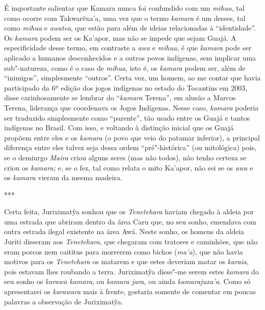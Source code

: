 É importante salientar que Kamara nunca foi confundido com um
\emph{mihua}, tal como ocorre com Takwarẽxa'a, uma vez que o termo
\emph{kamara} é um desses, tal como \emph{mihua} e \emph{awatea}, que
estão para além de ideias relacionadas à ``identidade''. Os \emph{kamara}
podem ser os Ka'apor, mas não se impede que sejam Guajá. A
especificidade desse termo, em contraste a \emph{awa} e \emph{mihua}, é
que \emph{kamara} pode ser aplicado a humanos desconhecidos e a outros
povos indígenas, sem implicar uma sub"-natureza, como é o caso de
\emph{mihua}, isto é, os \emph{kamara} podem ser, além de ``inimigos'',
simplesmente ``outros''. Certa vez, um homem, ao me contar que havia
participado da 6ª edição dos jogos indígenas no estado do Tocantins em
2003, disse carinhosamente se lembrar do ``\emph{kamara} Terena'', em
alusão a Marcos Terena, liderança que coordenava os Jogos Indígenas.
Nesse caso, \emph{kamara} poderia ser traduzido simplesmente como
``parente'', tão usado entre os Guajá e tantos indígenas no Brasil. Com
isso, e voltando à distinção inicial que os Guajá propõem entre eles e
os \emph{kamara} (o povo que veio do patamar inferior), a principal
diferença entre eles talvez seja dessa ordem ``pré"-histórica'' (ou
mitológica) pois, se o demiurgo \emph{Maira} criou alguns seres (mas não
todos), não tenho certeza se criou os \emph{kamara;} e, se o fez, tal
como relata o mito Ka'apor, não sei se os \emph{awa} e os \emph{kamara}
vieram da mesma madeira.

\begin{center}
***
\end{center}

Certa feita, Juriximatỹa sonhou que os \emph{Tenetehara} haviam chegado
à aldeia por uma estrada que abriram dentro da área Caru que, no seu
sonho, emendava com outra estrada ilegal existente na área Awá.
Neste sonho, os homens da aldeia Juriti disseram aos \emph{Tenetehara},
que chegaram com tratores e caminhões, que não eram porcos nem caititus
para morrerem como bichos (\emph{ma'a}), que não havia motivos para os
\emph{Tenetehara} os matarem e que estes deveriam matar os
\emph{karaia}, pois estavam lhes roubando a terra. Juriximatỹa disse"-me
serem estes \emph{kamara} do seu sonho os \emph{karawa kamara}, ou
\emph{kamara jara}, ou ainda \emph{kamarajuxa'a}. Como só apresentarei
os \emph{karawara} mais à frente, gostaria somente de comentar em poucas
palavras a observação de Juriximatỹa.

